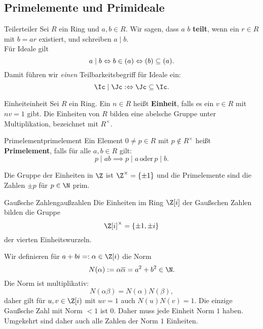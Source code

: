 \subsection{Primelemente und Primideale}
\label{subsec:primelementeideale}
\begin{definition}{Teiler}{teiler}
Sei $R$ ein Ring und $a,b \in R$. Wir sagen, dass $a$ $b$ \textbf{teilt}, wenn ein $r \in R$ mit $b=ar$ existiert, und schreiben $a \mid b$.\\
Für Ideale gilt
\begin{equation}
a \mid b \iff b \in (a) \iff (b) \sub (a).
\end{equation}
Damit führen wir \textit{einen} Teilbarkeitsbegriff für Ideale ein:
\begin{equation}
\Ic \mid \Jc : \iff \Jc \sub \Ic.
\end{equation}
\end{definition}
\begin{definition}{Einheit}{einheit}
Sei $R$ ein Ring. Ein $n \in R$ heißt \textbf{Einheit}, falls es ein $v\in R$ mit $nv = 1$ gibt. Die Einheiten von $R$ bilden eine abelsche Gruppe unter Multiplikation, bezeichnet mit $R^\times$.
\end{definition}
\begin{definition}{Primelement}{primelement}
Ein Element $0 \neq p \in R$ mit $p \notin R^\times$ heißt \textbf{Primelement}, falls für alle $a,b \in R$ gilt:
\begin{equation}
p \mid ab \implies p \mid a \, \text{oder} \, p \mid b.
\end{equation}
\end{definition}
\begin{beispiel}
Die Gruppe der Einheiten in $\Z$ ist $\Z^\times = \{\pm 1\}$ und die Primelemente sind die Zahlen $\pm p$ für $p \in \N$ prim.
\end{beispiel}
\begin{satz}{Gaußsche Zahlen}{gaußzahlen}
Die Einheiten im Ring $\Z[i]$ der Gaußschen Zahlen bilden die Gruppe
\begin{equation}
\Z[i]^\times = \{\pm 1, \pm i\}
\end{equation}
der vierten Einheitswurzeln.
\end{satz}
\begin{beweis}
Wir definieren für $a+bi =:\alpha \in \Z[i)$ die Norm
\begin{equation}
N(\alpha) := \alpha \overline{\alpha} = a^2 + b^2 \in \N.
\end{equation}
Die Norm ist multiplikativ:
\begin{equation}
N(\alpha \beta)= N(\alpha) N(\beta),
\end{equation}
daher gilt für $u,v \in \Z[i)$ mit $uv=1$ auch $N(u)N(v)=1$. Die einzige Gaußsche Zahl mit Norm $<1$ ist $0$. Daher muss jede Einheit Norm $1$ haben. Umgekehrt sind daher auch alle Zahlen der Norm $1$ Einheiten.
\end{beweis}
